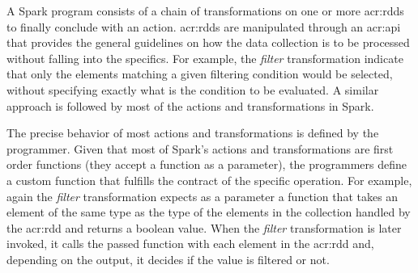 





A Spark program consists of a chain of transformations on one or more \acrshort{acr:rdd}s to finally conclude with an action. \acrshort{acr:rdd}s are manipulated through an \acrshort{acr:api} that provides the general guidelines on how the data collection is to be processed without falling into the specifics. For example, the \textit{filter} transformation indicate that only the elements matching a given filtering condition would be selected, without specifying exactly what is the condition to be evaluated. A similar approach is followed by most of the actions and transformations in Spark.

The precise behavior of most actions and transformations is defined by the programmer. Given that most of Spark's actions and transformations are first order functions (they accept a function as a parameter), the programmers define a custom function that fulfills the contract of the specific operation. For example, again the \textit{filter} transformation expects as a parameter a function that takes an element of the same type as the type of the elements in the collection handled by the \acrshort{acr:rdd} and returns a boolean value. When the \textit{filter} transformation is later invoked, it calls the passed function with each element in the \acrshort{acr:rdd} and, depending on the output, it decides if the value is filtered or not.


